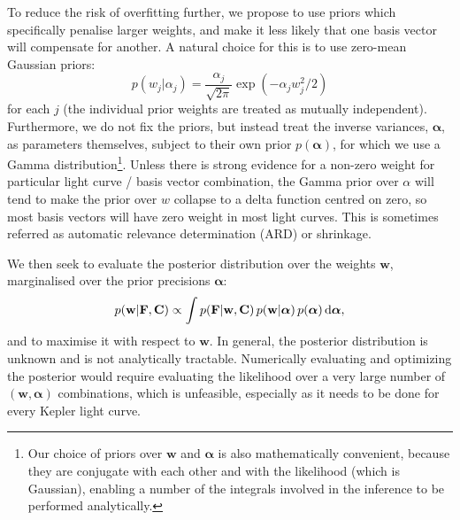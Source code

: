 \documentclass[useAMS,usenatbib]{mn2e}
\begin{document}
To reduce the risk of overfitting further, we propose to use priors
which specifically penalise larger weights, and make it less likely
that one basis vector will compensate for another. A natural choice
for this is to use zero-mean Gaussian priors:
\begin{equation}
p(w_j|\alpha_j) = \frac{\alpha_j}{\sqrt{2 \pi}} \exp\left(-\alpha_j w_j^2 / 2 \right)
\end{equation}
for each $j$ (the individual prior weights are treated as
mutually independent).  Furthermore, we do not fix the priors, but
instead treat the inverse variances, $\boldsymbol{\alpha}$, as
parameters themselves, subject to their own prior
$p(\boldsymbol{\alpha})$, for which we use a Gamma
distribution\footnote{Our choice of priors over $\mathbf{w}$ and
  $\boldsymbol{\alpha}$ is also mathematically convenient, because
  they are conjugate with each other and with the likelihood (which is
  Gaussian), enabling a number of the integrals involved in the
  inference to be performed analytically.}. Unless there is strong evidence for a non-zero weight
for particular light curve / basis vector combination, the Gamma prior over
$\alpha$ will tend to make the prior over $w$ collapse to a delta
function centred on zero, so most basis vectors will have zero weight in most
light curves. This is sometimes referred as
automatic relevance determination (ARD) or shrinkage.

We then seek to evaluate the posterior distribution over the weights
$\mathbf{w}$, marginalised over the prior precisions
$\boldsymbol{\alpha}$:
\begin{equation}
p(\mathbf{w}|\mathbf{F},\mathbf{C}) \propto \int
p(\mathbf{F}|\mathbf{w},\mathbf{C})  \, p(\mathbf{w}|\boldsymbol{\alpha}) \, p(\boldsymbol{\alpha}) \, {\rm d}\boldsymbol{\alpha},
\end{equation} 
and to maximise it with respect to $\mathbf{w}$. In general, the
posterior distribution is unknown and is not analytically
tractable. Numerically evaluating and optimizing the posterior would
require evaluating the likelihood over a very large number
of $(\mathbf{w},\boldsymbol{\alpha})$ combinations, which is
unfeasible, especially as it needs to be done for every Kepler
light curve. 
\end{document}
